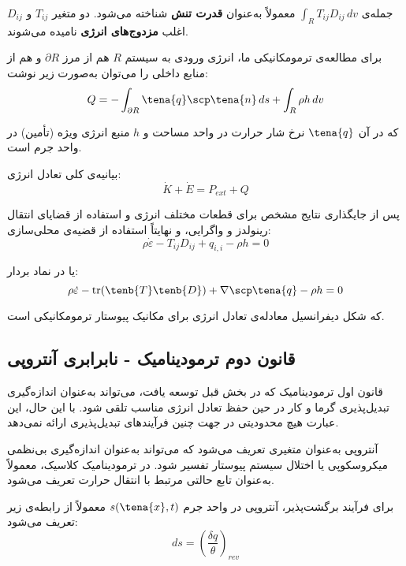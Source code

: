 جمله‌ی $\int_R T_{ij} D_{ij} \, dv$ معمولاً به‌عنوان \textbf{قدرت تنش} شناخته می‌شود. دو متغیر $T_{ij}$ و $D_{ij}$ اغلب \textbf{مزدوج‌های انرژی} نامیده می‌شوند.

برای مطالعه‌ی ترمومکانیکی ما، انرژی ورودی به سیستم $R$ هم از مرز $\partial R$ و هم از منابع داخلی را می‌توان به‌صورت زیر نوشت:
\begin{equation}
	Q = -\int_{\partial R} \tena{q} \scp \tena{n} \, ds + \int_R \rho h \, dv
\end{equation}

که در آن $\tena{q}$ نرخ شار حرارت در واحد مساحت و $h$ منبع انرژی ویژه (تأمین) در واحد جرم است.

بیانیه‌ی کلی تعادل انرژی:
\begin{equation}
	\dot{K} + \dot{E} = P_{ext} + Q
\end{equation}

پس از جایگذاری نتایج مشخص برای قطعات مختلف انرژی و استفاده از قضایای انتقال رینولدز و واگرایی، و نهایتاً استفاده از قضیه‌ی محلی‌سازی:
\begin{equation}
	\rho \dot{\varepsilon} - T_{ij} D_{ij} + q_{i,i} - \rho h = 0
\end{equation}

یا در نماد بردار:
\begin{equation}
	\rho \dot{\varepsilon} - \text{tr}(\tenb{T} \tenb{D}) + \nabla \scp \tena{q} - \rho h = 0
\end{equation}

که شکل دیفرانسیل معادله‌ی تعادل انرژی برای مکانیک پیوستار ترمومکانیکی است.

\subsection{قانون دوم ترمودینامیک - نابرابری آنتروپی}

قانون اول ترمودینامیک که در بخش قبل توسعه یافت، می‌تواند به‌عنوان اندازه‌گیری تبدیل‌پذیری گرما و کار در حین حفظ تعادل انرژی مناسب تلقی شود. با این حال، این عبارت هیچ محدودیتی در جهت چنین فرآیندهای تبدیل‌پذیری ارائه نمی‌دهد.

آنتروپی به‌عنوان متغیری تعریف می‌شود که می‌تواند به‌عنوان اندازه‌گیری بی‌نظمی میکروسکوپی یا اختلال سیستم پیوستار تفسیر شود. در ترمودینامیک کلاسیک، معمولاً به‌عنوان تابع حالتی مرتبط با انتقال حرارت تعریف می‌شود.

برای فرآیند برگشت‌پذیر، آنتروپی در واحد جرم $s(\tena{x}, t)$ معمولاً از رابطه‌ی زیر تعریف می‌شود:
\begin{equation}
	ds = \left( \frac{\delta q}{\theta} \right)_{rev}
\end{equation}

